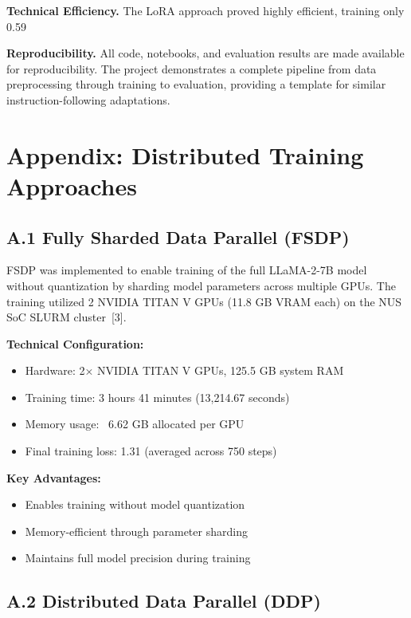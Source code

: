 \documentclass{assignment7_report}
\begin{document}
\textbf{Technical Efficiency.} The LoRA approach proved highly efficient, training only 0.59%

\textbf{Reproducibility.} All code, notebooks, and evaluation results are made available for reproducibility. The project demonstrates a complete pipeline from data preprocessing through training to evaluation, providing a template for similar instruction-following adaptations.

\section*{Appendix: Distributed Training Approaches}

\subsection*{A.1 Fully Sharded Data Parallel (FSDP)}

FSDP was implemented to enable training of the full LLaMA-2-7B model without quantization by sharding model parameters across multiple GPUs. The training utilized 2 NVIDIA TITAN V GPUs (11.8 GB VRAM each) on the NUS SoC SLURM cluster~[3].

\textbf{Technical Configuration:}
\begin{itemize}
    \item Hardware: 2× NVIDIA TITAN V GPUs, 125.5 GB system RAM
    \item Training time: 3 hours 41 minutes (13,214.67 seconds)
    \item Memory usage: ~6.62 GB allocated per GPU
    \item Final training loss: 1.31 (averaged across 750 steps)
\end{itemize}

\textbf{Key Advantages:}
\begin{itemize}
    \item Enables training without model quantization
    \item Memory-efficient through parameter sharding
    \item Maintains full model precision during training
\end{itemize}

\subsection*{A.2 Distributed Data Parallel (DDP)}
\end{document}
